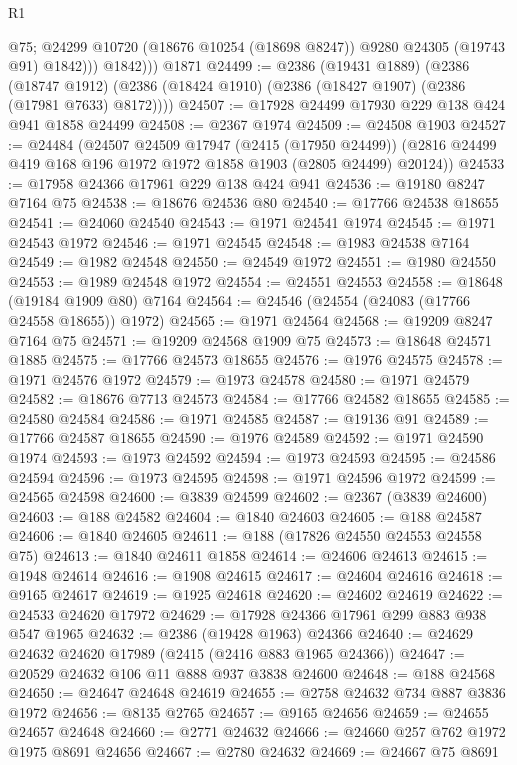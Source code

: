 \begin{lexlean}{R1}
\begin{coremodule}
              @75;
            @24299 @10720 (@18676 @10254 (@18698 @8247)) @9280 @24305 (@19743 @91) @1842)))
          @1842)))
    @1871
@24499 := @2386
    (@19431 @1889)
    (@2386
      (@18747 @1912)
      (@2386 (@18424 @1910) (@2386 (@18427 @1907) (@2386 (@17981 @7633) @8172))))
@24507 := @17928 @24499 @17930 @229 @138 @424 @941 @1858 @24499
@24508 := @2367 @1974
@24509 := @24508 @1903
@24527 := @24484
    (@24507
      @24509
      @17947
      (@2415 (@17950 @24499))
      (@2816 @24499 @419 @168 @196 @1972 @1972 @1858 @1903 (@2805 @24499) @20124))
@24533 := @17958 @24366 @17961 @229 @138 @424 @941
@24536 := @19180 @8247 @7164 @75
@24538 := @18676 @24536 @80
@24540 := @17766 @24538 @18655
@24541 := @24060 @24540
@24543 := @1971 @24541 @1974
@24545 := @1971 @24543 @1972
@24546 := @1971 @24545
@24548 := @1983 @24538 @7164
@24549 := @1982 @24548
@24550 := @24549 @1972
@24551 := @1980 @24550
@24553 := @1989 @24548 @1972
@24554 := @24551 @24553
@24558 := @18648 (@19184 @1909 @80) @7164
@24564 := @24546 (@24554 (@24083 (@17766 @24558 @18655)) @1972)
@24565 := @1971 @24564
@24568 := @19209 @8247 @7164 @75
@24571 := @19209 @24568 @1909 @75
@24573 := @18648 @24571 @1885
@24575 := @17766 @24573 @18655
@24576 := @1976 @24575
@24578 := @1971 @24576 @1972
@24579 := @1973 @24578
@24580 := @1971 @24579
@24582 := @18676 @7713 @24573
@24584 := @17766 @24582 @18655
@24585 := @24580 @24584
@24586 := @1971 @24585
@24587 := @19136 @91
@24589 := @17766 @24587 @18655
@24590 := @1976 @24589
@24592 := @1971 @24590 @1974
@24593 := @1973 @24592
@24594 := @1973 @24593
@24595 := @24586 @24594
@24596 := @1973 @24595
@24598 := @1971 @24596 @1972
@24599 := @24565 @24598
@24600 := @3839 @24599
@24602 := @2367 (@3839 @24600)
@24603 := @188 @24582
@24604 := @1840 @24603
@24605 := @188 @24587
@24606 := @1840 @24605
@24611 := @188 (@17826 @24550 @24553 @24558 @75)
@24613 := @1840 @24611 @1858
@24614 := @24606 @24613
@24615 := @1948 @24614
@24616 := @1908 @24615
@24617 := @24604 @24616
@24618 := @9165 @24617
@24619 := @1925 @24618
@24620 := @24602 @24619
@24622 := @24533 @24620 @17972
@24629 := @17928 @24366 @17961 @299 @883 @938 @547 @1965
@24632 := @2386 (@19428 @1963) @24366
@24640 := @24629 @24632 @24620 @17989 (@2415 (@2416 @883 @1965 @24366))
@24647 := @20529 @24632 @106 @11 @888 @937 @3838 @24600
@24648 := @188 @24568
@24650 := @24647 @24648 @24619
@24655 := @2758 @24632 @734 @887 @3836 @1972
@24656 := @8135 @2765
@24657 := @9165 @24656
@24659 := @24655 @24657 @24648
@24660 := @2771 @24632
@24666 := @24660 @257 @762 @1972 @1975 @8691 @24656
@24667 := @2780 @24632
@24669 := @24667 @75 @8691

\end{coremodule}
\end{lexlean}

